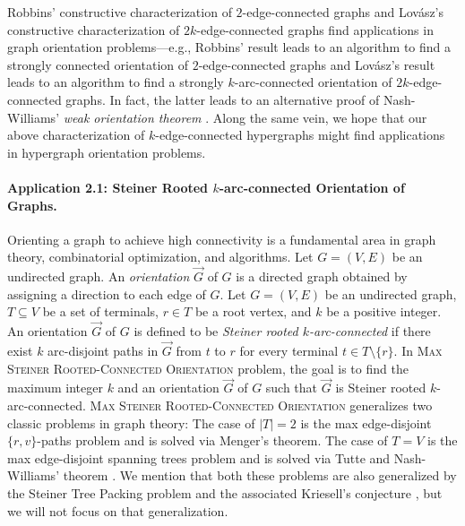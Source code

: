 \begin{remark}
Robbins' constructive characterization of $2$-edge-connected graphs and Lov\'{a}sz's constructive characterization of $2k$-edge-connected graphs find applications in graph orientation problems---e.g., 
Robbins' result leads to an algorithm to find a strongly connected orientation of $2$-edge-connected graphs and 
Lov\'{a}sz's result leads to an algorithm to find a strongly $k$-arc-connected orientation of $2k$-edge-connected graphs. In fact, the latter leads to an alternative proof of Nash-Williams' \emph{weak orientation theorem} \cite{NW60}. 
Along the same vein, we hope that our above characterization of $k$-edge-connected hypergraphs might find applications in hypergraph orientation problems. 
\end{remark}


\paragraph{Application 2.1: Steiner Rooted $k$-arc-connected Orientation of Graphs.}
Orienting a graph to achieve high connectivity is a fundamental area in graph theory, combinatorial optimization, and algorithms. Let $G=(V, E)$ be an undirected graph.  An \emph{orientation} $\overrightarrow{G}$ of $G$ is a directed graph obtained by assigning a direction to each edge of $G$. 
Let $G=(V, E)$ be an undirected graph, $T\subseteq V$ be a set of terminals, $r\in T$ be a root vertex, and $k$ be a positive integer. 
An orientation $\overrightarrow{G}$ of $G$ is defined to be \emph{Steiner rooted $k$-arc-connected} if there exist $k$ arc-disjoint paths in $\overrightarrow{G}$ %
from $t$ to $r$ 
for every terminal $t\in T\setminus \{r\}$. 
In \textsc{Max Steiner Rooted-Connected Orientation} problem, the goal is to find the maximum integer $k$ and an orientation $\overrightarrow{G}$ of $G$ such that $\overrightarrow{G}$ is Steiner rooted $k$-arc-connected. 
\textsc{Max Steiner Rooted-Connected Orientation} generalizes two classic problems in graph theory: The case of $|T|=2$ is the max edge-disjoint $\{r,v\}$-paths problem and is solved via Menger's theorem. The case of $T=V$ is the max edge-disjoint spanning trees problem and is solved via Tutte and Nash-Williams' theorem \cite{Tu61, NW61}. We mention that both these problems are also generalized by the Steiner Tree Packing problem and the associated Kriesell's conjecture \cite{Kri03, JMS03, Lau07}, but we will not focus on that generalization. 

